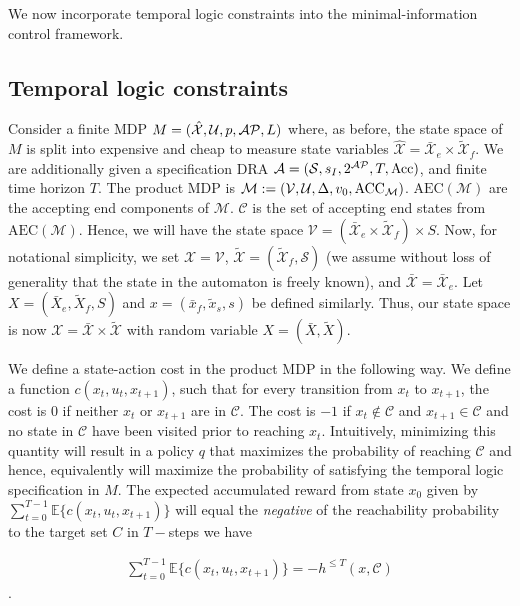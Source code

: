 We now incorporate temporal logic constraints into the minimal-information control framework.
\subsection{Temporal logic constraints}
Consider a finite MDP $M=(\mathcal{\hat{X}},\mathcal{U},p,\mathcal{AP},L)$ where, as before, the state space of $M$ is split into expensive and cheap to measure state variables $\mathcal{\hat{X}} = \mathcal{\bar{X}}_e \times \mathcal{\tilde{X}}_f$. We are additionally given a specification DRA $\mathcal{A} = (\mathcal{S},s_I,2^{\mathcal{AP}}, T,\textrm{Acc})$, and finite time horizon $T$. The product MDP is $\mathcal{M}:= (\mathcal{V},\mathcal{U}, \Delta,v_0,\textrm{ACC}_{\mathcal{M}})$. $\textrm{AEC}(\mathcal{M})$ are the accepting end components of $\mathcal{M}$. $\mathcal{C}$ is the set of accepting end states from $\textrm{AEC}(\mathcal{M})$.  Hence, we will have the state space $\mathcal{V} = (\mathcal{\bar{X}}_e \times \mathcal{\tilde{X}}_f) \times S$. Now, for notational simplicity, we set $\mathcal{X} = \mathcal{V}$, $\mathcal{\tilde{X}} = (\mathcal{\tilde{X}}_f,\mathcal{S})$ (we assume without loss of generality that the state in the automaton is freely known), and $\mathcal{\bar{X}} = \mathcal{\bar{X}}_e$. Let $X = (\bar{X}_e,\tilde{X}_f,S)$ and $x = (\bar{x}_f,\tilde{x}_s,s)$ be defined similarly. Thus, our state space is now $\mathcal{X}= \mathcal{\bar{X}} \times \mathcal{\tilde{X}}$ with random variable $X = (\bar{X},\tilde{X})$. 

We define a state-action cost in the product MDP in the following way. We define a function $c(x_t,u_t,x_{t+1})$, such that for every transition from $x_t$ to $x_{t+1}$, the cost is $0$ if neither $x_t$ or $x_{t+1}$ are in $\mathcal{C}$. The cost is $-1$ if $x_t \notin \mathcal{C}$ and $x_{t+1} \in \mathcal{C}$ and no state in $\mathcal{C}$ have been visited prior to reaching $x_t$.  Intuitively, minimizing this quantity will result in a policy $q$ that maximizes the probability of reaching $\mathcal{C}$ and hence, equivalently will maximize the probability of satisfying the temporal logic specification in $M$. The expected accumulated reward from state $x_0$ given by $\sum_{t=0}^{T-1}\mathbb{E}\{c(x_t,u_t,x_{t+1})\}$ will equal the \emph{negative} of the reachability probability to the target set $C$ in $T-$steps \ie we have

\begin{align}\label{eqn:cost}
\sum_{t=0}^{T-1}\mathbb{E}\{c(x_t,u_t,x_{t+1})\} = -h^{\leq T}(x,\mathcal{C})
\end{align}.

